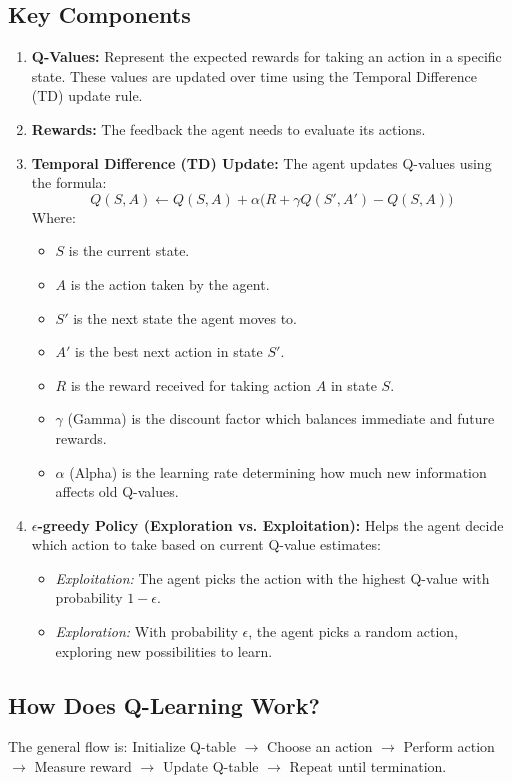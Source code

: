 \documentclass[12pt]{article}
\begin{document}
\subsection{Key Components}
\begin{enumerate}
    \item \textbf{Q-Values:} Represent the expected rewards for taking an action in a specific state. These values are updated over time using the Temporal Difference (TD) update rule.
    \item \textbf{Rewards:} The feedback the agent needs to evaluate its actions.
    \item \textbf{Temporal Difference (TD) Update:} The agent updates Q-values using the formula:
    \[ Q(S, A) \leftarrow Q(S, A) + \alpha \big( R + \gamma Q(S', A') - Q(S, A) \big) \]
    Where:
    \begin{itemize}
        \item $S$ is the current state.
        \item $A$ is the action taken by the agent.
        \item $S'$ is the next state the agent moves to.
        \item $A'$ is the best next action in state $S'$.
        \item $R$ is the reward received for taking action $A$ in state $S$.
        \item $\gamma$ (Gamma) is the discount factor which balances immediate and future rewards.
        \item $\alpha$ (Alpha) is the learning rate determining how much new information affects old Q-values.
    \end{itemize}
    \item \textbf{$\epsilon$-greedy Policy (Exploration vs. Exploitation):} Helps the agent decide which action to take based on current Q-value estimates:
    \begin{itemize}
        \item \textit{Exploitation:} The agent picks the action with the highest Q-value with probability $1-\epsilon$.
        \item \textit{Exploration:} With probability $\epsilon$, the agent picks a random action, exploring new possibilities to learn.
    \end{itemize}
\end{enumerate}

\subsection{How Does Q-Learning Work?}
The general flow is: Initialize Q-table $\rightarrow$ Choose an action $\rightarrow$ Perform action $\rightarrow$ Measure reward $\rightarrow$ Update Q-table $\rightarrow$ Repeat until termination.
\end{document}
